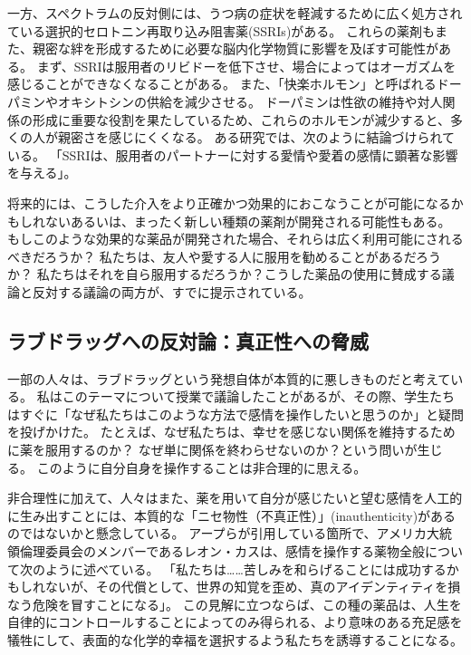 \documentclass[paper=a4,book,openany]{jlreq} \usepackage{mystyle}
\begin{document}
一方、スペクトラムの反対側には、うつ病の症状を軽減するために広く処方されている選択的セロトニン再取り込み阻害薬(SSRIs)がある。
これらの薬剤もまた、親密な絆を形成するために必要な脳内化学物質に影響を及ぼす可能性がある。
まず、SSRIは服用者のリビドーを低下させ、場合によってはオーガズムを感じることができなくなることがある。
また、「快楽ホルモン」と呼ばれるドーパミンやオキシトシンの供給を減少させる。
ドーパミンは性欲の維持や対人関係の形成に重要な役割を果たしているため、これらのホルモンが減少すると、多くの人が親密さを感じにくくなる。
ある研究では、次のように結論づけられている。
「SSRIは、服用者のパートナーに対する愛情や愛着の感情に顕著な影響を与える」\citep{marazzitia14:_dimor_chang_some_featur_lovin}。

将来的には、こうした介入をより正確かつ効果的におこなうことが可能になるかもしれない{\DDASH}あるいは、まったく新しい種類の薬剤が開発される可能性もある。
もしこのような効果的な薬品が開発された場合、それらは広く利用可能にされるべきだろうか？ 私たちは、友人や愛する人に服用を勧めることがあるだろうか？ 私たちはそれを自ら服用するだろうか？こうした薬品の使用に賛成する議論と反対する議論の両方が、すでに提示されている。

\subsection{ラブドラッグへの反対論：真正性への脅威}

一部の人々は、ラブドラッグという発想自体が本質的に悪しきものだと考えている。
私はこのテーマについて授業で議論したことがあるが、その際、学生たちはすぐに「なぜ私たちはこのような方法で感情を操作したいと思うのか」と疑問を投げかけた。
たとえば、なぜ私たちは、幸せを感じない関係を維持するために薬を服用するのか？ なぜ単に関係を終わらせないのか？という問いが生じる。
このように自分自身を操作することは非合理的に思える。

非合理性に加えて、人々はまた、薬を用いて自分が感じたいと望む感情を人工的に生み出すことには、本質的な「ニセ物性（不真正性）」(inauthenticity)があるのではないかと懸念している。
アープらが引用している箇所で、アメリカ大統領倫理委員会のメンバーであるレオン・カスは、感情を操作する薬物全般について次のように述べている。
「私たちは……苦しみを和らげることには成功するかもしれないが、その代償として、世界の知覚を歪め、真のアイデンティティを損なう危険を冒すことになる」\citep[p.227]{kass03:_beyon_therap}。
この見解に立つならば、この種の薬品は、人生を自律的にコントロールすることによってのみ得られる、より意味のある充足感を犠牲にして、表面的な化学的幸福を選択するよう私たちを誘導することになる。
\end{document}
